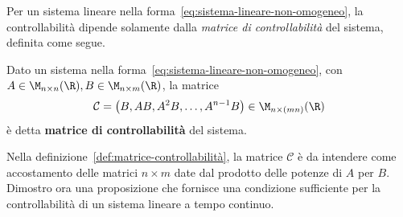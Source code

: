 Per un sistema lineare nella forma~\eqref{eq:sistema-lineare-non-omogeneo},
la controllabilità dipende solamente dalla \emph{matrice di controllabilità} del sistema, definita come segue.
\begin{definition}
    Dato un sistema nella forma~\eqref{eq:sistema-lineare-non-omogeneo}, con $A \in \M_{n\times n}(\R), B \in \M_{n\times m}(\R)$,
    la matrice
    \begin{equation*}
        \mathcal C = \left(B, AB, A^2B, \ldots, A^{n-1}B \right) \in \M_{n\times (mn)}(\R)
    \end{equation*}
    è detta \textbf{matrice di controllabilità} del sistema.
    \label{def:matrice-controllabilità}
\end{definition}
Nella definizione~\ref{def:matrice-controllabilità}, la matrice $\mathcal C$ è
da intendere come accostamento delle matrici $n \times m$ date dal prodotto delle
potenze di $A$ per $B$.
Dimostro ora una proposizione che fornisce una condizione sufficiente per
la controllabilità di un sistema lineare a tempo continuo.


